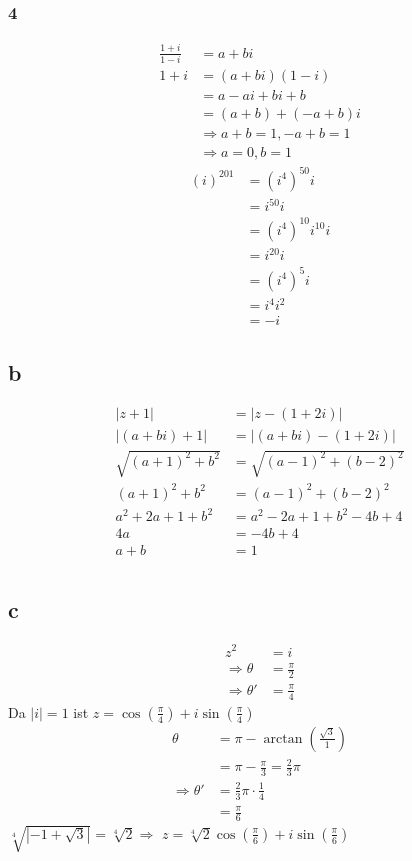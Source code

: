 \documentclass{article}
\begin{document}
\subsubsection*{4}
\begin{align*}
    \frac{1+i}{1-i}&=a+bi\\
    1+i&=(a+bi)(1-i)\\
    &=a-ai+bi+b\\
    &=(a+b)+(-a+b)i\\
    &\Rightarrow a+b=1,-a+b=1\\
    &\Rightarrow a=0,b=1
\end{align*}
\begin{align*}
    (i)^{201}&=(i^4)^{50}i\\
    &=i^{50}i\\
    &=(i^4)^{10}i^{10}i\\
    &=i^{20}i\\
    &=(i^4)^{5}i\\
    &=i^4i^2\\
    &=-i
\end{align*}
\subsection*{b}
\begin{align*}
    |z+1|&=|z-(1+2i)|\\
    |(a+bi)+1|&=|(a+bi)-(1+2i)|\\
    \sqrt{(a+1)^2+b^2}&=\sqrt{(a-1)^2+(b-2)^2}\\
    (a+1)^2+b^2&=(a-1)^2+(b-2)^2\\
    a^2+2a+1+b^2&=a^2-2a+1+b^2-4b+4\\
    4a&=-4b+4\\
    a+b&=1\\
\end{align*}
\subsection*{c}
\begin{align*}
    z^2&=i\\
    \Rightarrow \theta &= \frac{\pi}{2}\\
    \Rightarrow \theta' &= \frac{\pi}{4}
\end{align*}
Da $|i|=1$ ist $z=\cos(\frac{\pi}{4})+i\sin(\frac{\pi}{4})$
\begin{align*}
    \theta &= \pi - \arctan(\frac{\sqrt{3}}{1})\\
    &=\pi - \frac{\pi}{3}=\frac{2}{3}\pi\\
    \Rightarrow \theta' &=\frac{2}{3}\pi\cdot\frac{1}{4}\\
    &=\frac{\pi}{6}
\end{align*}
$\sqrt[4]{|-1+\sqrt{3}|}= \sqrt[4]{2}\Rightarrow$ 
$z=\sqrt[4]{2}\cos(\frac{\pi}{6})+i\sin(\frac{\pi}{6})$
\end{document}
